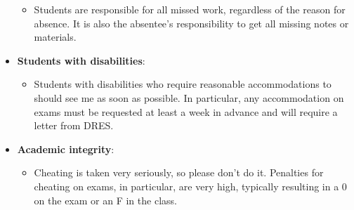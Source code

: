 \documentclass[11pt]{article}
\begin{document}
\begin{itemize}
\begin{itemize}
			\item Students are responsible for all missed work, regardless of the reason for absence. It is also the absentee's responsibility to get all missing notes or materials. 
		\end{itemize}
	\item \textbf{Students with disabilities}:
		\begin{itemize}
		\item Students with disabilities who require reasonable accommodations to should see me as soon as possible. In particular, any accommodation on exams must be requested at least a week in advance and will require a letter from DRES.
		\end{itemize}
	\item \textbf{Academic integrity}:
		\begin{itemize}
		\item Cheating is taken very seriously, so please don't do it. Penalties for cheating on exams, in particular, are very high, typically resulting in a 0 on the exam or an F in the class.
		\end{itemize}
\end{itemize}
\end{document}
